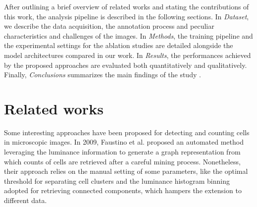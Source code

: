 After outlining a brief overview of related works and stating the contributions of this work, the analysis pipeline is described in the following sections. 
In \textit{Dataset}, we describe the data acquisition, the annotation process and peculiar characteristics and challenges of the images. 
In \textit{Methods}, the training pipeline and the experimental settings for the ablation studies are detailed alongside the model architectures compared in our work.
In \textit{Results}, the performances achieved by the proposed approaches are evaluated both quantitatively and qualitatively.
Finally, \textit{Conclusions} summarizes the main findings of the study
.


\section{Related works}
\label{sec:related_works}

Some interesting approaches have been proposed for detecting and counting cells in microscopic images. 
In 2009, Faustino et al. \cite{Faustino2009} proposed an automated method leveraging the luminance information to generate a graph representation from which counts of cells are retrieved after a careful mining process. Nonetheless, their approach relies on the manual setting of some parameters, like the optimal threshold for separating cell clusters and the luminance histogram binning adopted for retrieving connected components, which hampers the extension to different data.

